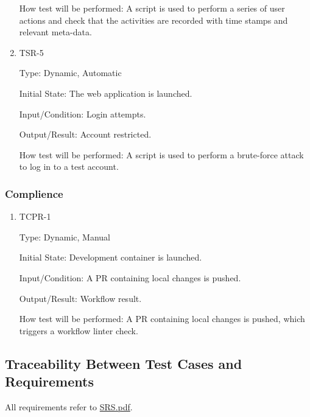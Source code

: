 \documentclass[12pt, titlepage]{article}
\begin{document}
\begin{enumerate}
How test will be performed: A script is used to perform a series of user actions and check that the activities are recorded with time stamps and relevant meta-data.

\item{TSR-5\\}\label{TSR-5}

Type: Dynamic, Automatic
					
Initial State: The web application is launched.
					
Input/Condition: Login attempts.
					
Output/Result: Account restricted.
					
How test will be performed: A script is used to perform a brute-force attack to log in to a test account.
\end{enumerate}

\subsubsection{Complience}

\begin{enumerate}
\item{TCPR-1\\}\label{TCPR-1}

Type: Dynamic, Manual
					
Initial State: Development container is launched.
					
Input/Condition: A PR containing local changes is pushed.
					
Output/Result: Workflow result.
					
How test will be performed: A PR containing local changes is pushed, which triggers a workflow linter check.
\end{enumerate}
\subsection{Traceability Between Test Cases and Requirements}
All requirements refer to \href{https://github.com/wangq131/4G06CapstoneProjectT5/blob/689841fefc298f80d84232996e1c7ca7981dd93d/docs/SRS/SRS.pdf}{SRS.pdf}.
\end{document}
